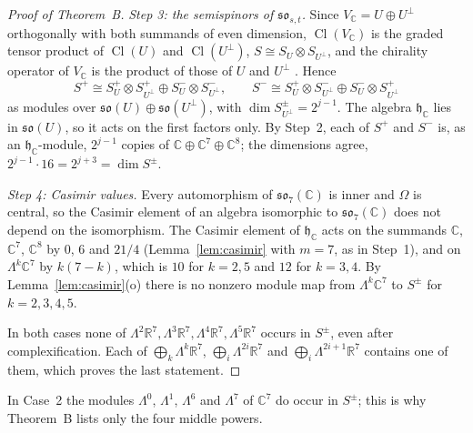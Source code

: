 \documentclass[11pt]{amsart}
\theoremstyle{remark}
\newcommand{\so}{\mathfrak{so}}
\newcommand{\h}{\mathfrak{h}}
\newcommand{\R}{\mathbb{R}}
\newcommand{\C}{\mathbb{C}}
\DeclareMathOperator{\Cl}{Cl}
\begin{document}
\begin{proof}[Proof of Theorem~B]
\emph{Step 3: the semispinors of $\so_{s,t}$.} Since $V_\C=U\oplus U^\perp$ orthogonally with both summands of even dimension, $\Cl(V_\C)$ is the graded tensor product of $\Cl(U)$ and $\Cl(U^\perp)$, $S\cong S_U\otimes S_{U^\perp}$, and the chirality operator of $V_\C$ is the product of those of $U$ and $U^\perp$ \cite[Ch.~I, \S 1]{LM89}. Hence
\[
S^+\cong S_U^+\otimes S_{U^\perp}^+\oplus S_U^-\otimes S_{U^\perp}^-,\qquad
S^-\cong S_U^+\otimes S_{U^\perp}^-\oplus S_U^-\otimes S_{U^\perp}^+
\]
as modules over $\so(U)\oplus\so(U^\perp)$, with $\dim S_{U^\perp}^\pm=2^{j-1}$. The algebra $\h_\C$ lies in $\so(U)$, so it acts on the first factors only. By Step~2, each of $S^+$ and $S^-$ is, as an $\h_\C$-module, $2^{j-1}$ copies of $\C\oplus\C^7\oplus\C^8$; the dimensions agree, $2^{j-1}\cdot16=2^{j+3}=\dim S^\pm$.

\emph{Step 4: Casimir values.} Every automorphism of $\so_7(\C)$ is inner and $\Omega$ is central, so the Casimir element of an algebra isomorphic to $\so_7(\C)$ does not depend on the isomorphism. The Casimir element of $\h_\C$ acts on the summands $\C$, $\C^7$, $\C^8$ by $0$, $6$ and $21/4$ (Lemma~\ref{lem:casimir} with $m=7$, as in Step~1), and on $\Lambda^k\C^7$ by $k(7-k)$, which is $10$ for $k=2,5$ and $12$ for $k=3,4$. By Lemma~\ref{lem:casimir}(o) there is no nonzero module map from $\Lambda^k\C^7$ to $S^\pm$ for $k=2,3,4,5$.

In both cases none of $\Lambda^2\R^7,\Lambda^3\R^7,\Lambda^4\R^7,\Lambda^5\R^7$ occurs in $S^\pm$, even after complexification. Each of $\bigoplus_k\Lambda^k\R^7$, $\bigoplus_i\Lambda^{2i}\R^7$ and $\bigoplus_i\Lambda^{2i+1}\R^7$ contains one of them, which proves the last statement.
\end{proof}

In Case~2 the modules $\Lambda^0$, $\Lambda^1$, $\Lambda^6$ and $\Lambda^7$ of $\C^7$ do occur in $S^\pm$; this is why Theorem~B lists only the four middle powers.
\end{document}
